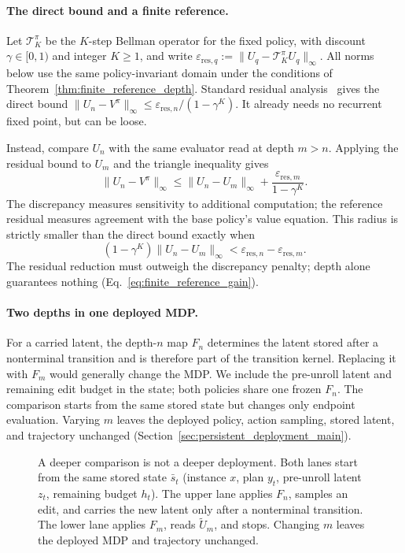 \documentclass{article}
\theoremstyle{plain}
\theoremstyle{definition}
\theoremstyle{remark}
\begin{document}
\paragraph{The direct bound and a finite reference.}
Let $\mathcal T_K^\pi$ be the $K$-step Bellman operator for the fixed policy,
with discount $\gamma\in[0,1)$ and integer $K\ge1$, and write
$\varepsilon_{\mathrm{res},q}:=\|U_q-\mathcal T_K^\pi U_q\|_\infty$.
All norms below use the same policy-invariant domain under the conditions
of Theorem~\ref{thm:finite_reference_depth}. Standard residual
analysis~\citep{Puterman1994,SuttonBarto2018} gives the direct bound
$\|U_n-V^\pi\|_\infty\le\varepsilon_{\mathrm{res},n}/(1-\gamma^K)$.
It already needs no recurrent fixed point, but can be loose.

Instead, compare $U_n$ with the same evaluator read at depth $m>n$.
Applying the residual bound to $U_m$ and the triangle inequality gives
\[
\|U_n-V^\pi\|_\infty
\le
\|U_n-U_m\|_\infty
+\frac{\varepsilon_{\mathrm{res},m}}{1-\gamma^K}.
\]
The discrepancy measures sensitivity to additional computation; the
reference residual measures agreement with the base policy's value
equation. This radius is strictly smaller than the direct bound exactly
when
\[
(1-\gamma^K)\|U_n-U_m\|_\infty
<\varepsilon_{\mathrm{res},n}-\varepsilon_{\mathrm{res},m}.
\]
The residual reduction must outweigh the discrepancy penalty; depth alone
guarantees nothing (Eq.~\eqref{eq:finite_reference_gain}).

\paragraph{Two depths in one deployed MDP.}
For a carried latent, the depth-$n$ map $F_n$ determines the latent stored
after a nonterminal transition and is therefore part of the transition
kernel. Replacing it with $F_m$ would generally change the MDP.
We include the pre-unroll latent and remaining edit budget in the state;
both policies share one frozen $F_n$. The comparison starts from the same
stored state but changes only endpoint evaluation. Varying $m$ leaves
the deployed policy, action sampling, stored latent, and trajectory
unchanged (Section~\ref{sec:persistent_deployment_main}).

\begin{figure}[t]
\centering
\resizebox{0.92\linewidth}{!}{}
\caption{A deeper comparison is not a deeper deployment. Both lanes start
from the same stored state $\bar s_t$ (instance $x$, plan $y_t$, pre-unroll
latent $z_t$, remaining budget $h_t$). The upper lane applies $F_n$, samples
an edit, and carries the new latent only after a nonterminal transition. The
lower lane applies $F_m$, reads $\widetilde U_m$, and stops. Changing $m$
leaves the deployed MDP and trajectory unchanged.}
\label{fig:persistent_depth_lanes}
\end{figure}
\end{document}
